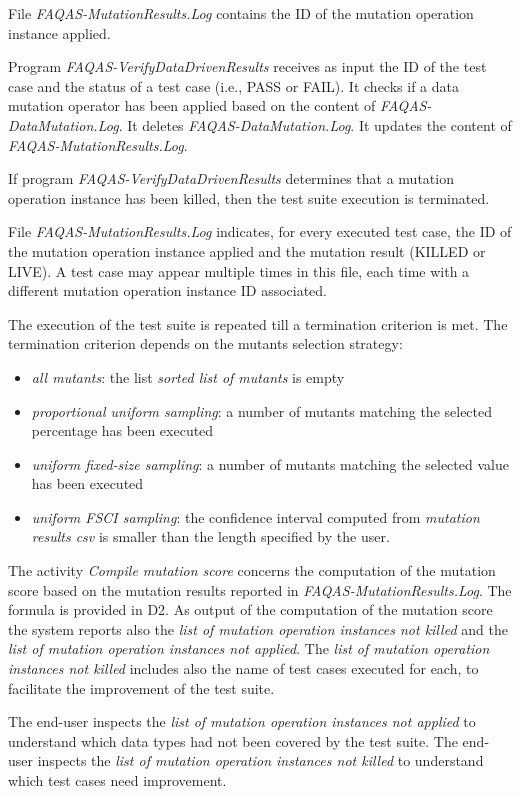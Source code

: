 File \emph{FAQAS-MutationResults.Log} contains the ID of the mutation operation instance applied.

Program \emph{FAQAS-VerifyDataDrivenResults} receives as input the ID of the test case and  the status of a test case (i.e., PASS or FAIL). It checks if a data mutation operator has been applied based on the content of \emph{FAQAS-DataMutation.Log}. It deletes \emph{FAQAS-DataMutation.Log}. It updates the content of \emph{FAQAS-MutationResults.Log}.

If program \emph{FAQAS-VerifyDataDrivenResults} determines that a mutation operation instance has been killed, then the test suite execution is terminated.

File \emph{FAQAS-MutationResults.Log} indicates, for every executed test case, the ID of the mutation operation instance applied and the mutation result (KILLED or LIVE). A test case may appear multiple times in this file, each time with a different mutation operation instance ID associated.

The execution of the test suite is repeated till a termination criterion is met. The termination criterion depends on the mutants selection strategy:
\begin{itemize}
\item \emph{all mutants}: the list \emph{sorted list of mutants} is empty
\item \emph{proportional uniform sampling}: a number of mutants matching the selected percentage has been executed
\item \emph{uniform fixed-size sampling}: a number of mutants matching the selected value has been executed
\item \emph{uniform FSCI sampling}: the confidence interval computed from \emph{mutation results csv} is smaller than the length specified by the user.
\end{itemize}

The activity \emph{Compile mutation score} concerns the computation of the mutation score based on the mutation results reported in \emph{FAQAS-MutationResults.Log}. The formula is provided in D2. As output of the computation of the mutation score the system reports also the \emph{list of mutation operation instances not killed} and the \emph{list of mutation operation instances not applied}. The \emph{list of mutation operation instances not killed} includes also the name of test cases executed for each, to facilitate the improvement of the test suite.

The end-user inspects the \emph{list of mutation operation instances not applied} to understand which data types had not been covered by the test suite. The end-user inspects the \emph{list of mutation operation instances not killed} to understand which test cases need improvement.


